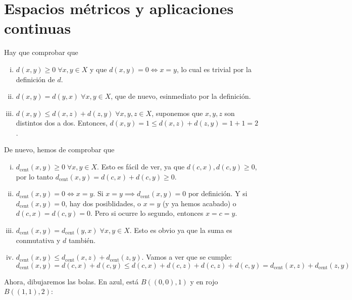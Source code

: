 \chapter{Espacios m\'etricos y aplicaciones continuas}

\begin{eje}
    Hay que comprobar que
    \begin{enumerate}[i)]
        \item $ d(x,y) \geq 0 \; \forall x,y \in X $ y que $ d(x,y) = 0 \iff x = y $, lo cual es trivial por la definición de $ d $.
        \item $ d(x,y) = d(y,x) \; \forall x, y \in X $, que de nuevo, esinmediato por la definición.
        \item $ d(x,y) \leq d(x,z) + d(z,y) \; \forall x, y, z \in X $, suponemos que $ x, y, z $ son distintos dos a dos. Entonces,
            $ d(x,y) = 1 \leq d(x, z) + d(z, y) = 1 + 1 = 2 $.
    \end{enumerate}
\end{eje}

\begin{eje}
    De nuevo, hemos de comprobar que
    \begin{enumerate}[i)]
        \item $d_{\text{cent}}(x, y) \geq 0 \; \forall x, y \in X$. Esto es fácil de ver, ya que $d(c, x), d(c,y) \geq 0$, por lo tanto
            $d_{\text{cent}}(x,y) = d(c,x) + d(c,y) \geq 0$.
        \item $d_{\text{cent}}(x, y) = 0 \iff x = y$. Si $x = y \implies d_{\text{cent}}(x,y) = 0$ por definición. Y si $d_{\text{cent}}(x,y) = 0$,
            hay dos posiblidades, o $x = y$ (y ya hemos acabado) o $d(c, x) = d(c,y) = 0$. Pero si ocurre lo segundo, entonces $x = c = y$.
        \item $d_{\text{cent}}(x, y) = d_{\text{cent}}(y, x) \; \forall x, y \in X$. Esto es obvio ya que la suma es conmutativa y $d$ tambi\'en.
        \item $d_{\text{cent}}(x,y) \leq d_{\text{cent}}(x, z) + d_{\text{cent}}(z, y)$. Vamos a ver que se cumple:
            \[
                d_{\text{cent}}(x, y) = d(c,x) + d(c,y) \leq d(c,x) + d(c,z) + d(c,z) + d(c,y) =
                d_{\text{cent}}(x, z) + d_{\text{cent}}(z,y)
            \]
    \end{enumerate}
    Ahora, dibujaremos las bolas. En azul, está $B\left( (0,0), 1 \right)$ y en rojo $B\left( (1,1), 2 \right)$:
    \begin{center}
        
    \end{center}
\end{eje}

